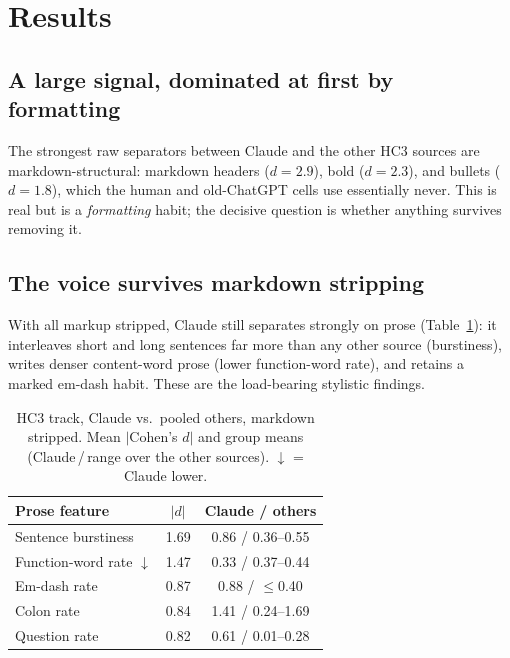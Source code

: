 \documentclass[11pt]{article}
\begin{document}
\section{Results}

\subsection{A large signal, dominated at first by formatting}
The strongest raw separators between Claude and the other HC3 sources are
markdown-structural: markdown headers ($d{=}2.9$), bold ($d{=}2.3$), and bullets
($d{=}1.8$), which the human and old-ChatGPT cells use essentially never. This
is real but is a \emph{formatting} habit; the decisive question is whether
anything survives removing it.

\subsection{The voice survives markdown stripping}
\label{sec:prose}
With all markup stripped, Claude still separates strongly on prose
(Table~\ref{tab:prose}): it interleaves short and long sentences far more than
any other source (burstiness), writes denser content-word prose (lower
function-word rate), and retains a marked em-dash habit. These are the
load-bearing stylistic findings.

\begin{table}[t]
\centering\small
\setlength{\tabcolsep}{4pt}
\begin{tabular}{@{}lcc@{}}
\toprule
Prose feature & $|d|$ & Claude / others \\
\midrule
Sentence burstiness & 1.69 & 0.86 / 0.36--0.55 \\
Function-word rate $\downarrow$ & 1.47 & 0.33 / 0.37--0.44 \\
Em-dash rate & 0.87 & 0.88 / $\le$0.40 \\
Colon rate & 0.84 & 1.41 / 0.24--1.69 \\
Question rate & 0.82 & 0.61 / 0.01--0.28 \\
\bottomrule
\end{tabular}
\caption{HC3 track, Claude vs.\ pooled others, markdown stripped. Mean
$|$Cohen's $d|$ and group means (Claude\,/\,range over the other sources).
$\downarrow$ = Claude lower.}
\label{tab:prose}
\end{table}
\end{document}
